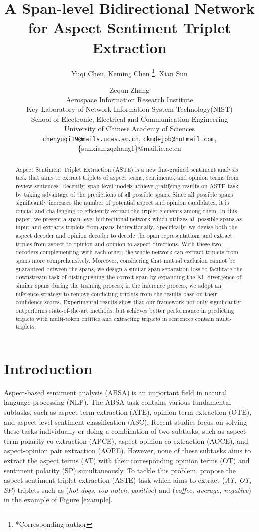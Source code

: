 \documentclass[11pt]{article}
\title{A Span-level Bidirectional Network for Aspect Sentiment Triplet Extraction}
\author{Yuqi Chen, Keming Chen \thanks{*Corresponding author}, Xian Sun\and Zequn Zhang \\
	Aerospace Information Research Institute \\ 
	Key Laboratory of Network Information System Technology(NIST) \\ 
	School of Electronic, Electrical and Communication Engineering\\ University of Chinese Academy of Sciences \\ 
	\texttt{chenyuqi19@mails.ucas.ac.cn}, \texttt{ckmdejob@hotmail.com}, \{sunxian,zqzhang1\}@mail.ie.ac.cn}
\begin{document}
\maketitle

\begin{abstract}
Aspect Sentiment Triplet Extraction (ASTE) is a new fine-grained sentiment analysis task that aims to extract triplets of aspect terms, sentiments, and opinion terms from review sentences. Recently, span-level models achieve gratifying results on ASTE task by taking advantage of the predictions of all possible spans.  Since all possible spans significantly increases the number of potential aspect and opinion candidates, it is crucial and challenging to efficiently extract  the triplet elements among them. In this paper, we present a span-level bidirectional network which utilizes all possible spans as input and extracts triplets from spans bidirectionally. Specifically, we devise both the aspect decoder and opinion decoder to decode the span representations and extract triples from aspect-to-opinion and opinion-to-aspect directions. With these two decoders complementing with each other, the whole network can extract triplets from spans more comprehensively. Moreover, considering that mutual exclusion cannot be guaranteed between the spans, we design a similar span separation loss to facilitate the downstream task of distinguishing the correct span by expanding the KL divergence of similar spans during the training process; in the inference process, we adopt an inference strategy to remove conflicting triplets from the results base on their confidence scores. Experimental results show that our framework not only significantly outperforms state-of-the-art methods, but achieves better performance in predicting triplets with multi-token entities and extracting triplets in sentences contain multi-triplets\footnotemark. 
\end{abstract}





\section{Introduction}

Aspect-based sentiment analysis (ABSA) is an important field in natural language processing (NLP). The ABSA task contains various fundamental subtasks, such as aspect term extraction (ATE), opinion term extraction (OTE), and aspect-level sentiment classification (ASC). Recent studies focus on solving these tasks individually or doing a combination of two subtasks, such as aspect term polarity co-extraction (APCE), aspect opinion co-extraction (AOCE), and aspect-opinion pair extraction (AOPE). However, none of these subtasks aims to extract the aspect terms (AT) with their corresponding opinion terms (OT) and sentiment polarity (SP) simultaneously. To tackle this problem, \cite{DBLP:conf/aaai/PengXBHLS20} propose the aspect sentiment triplet extraction (ASTE) task which aims to extract (\emph{AT, OT, SP}) triplets such as (\emph{hot dogs, top notch, positive}) and (\emph{coffee, average, negative}) in the example of Figure \ref{example}. 
\end{document}
